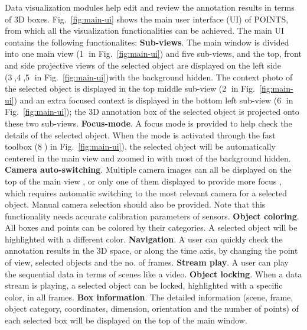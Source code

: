 \documentclass[letterpaper, 10 pt, conference]{ieeeconf}  %
\begin{document}
Data visualization modules help edit and review the annotation results in terms of 3D boxes. 
Fig.~\ref{fig:main-ui} shows the main user interface (UI) of POINTS, from which all the visualization functionalities can be achieved.
The main UI contains the following functionalites: 
\textbf{Sub-views}. The main window is divided into one main view (\textcircled{1} in Fig.~\ref{fig:main-ui}) and five sub-views,  and the top, front and side projective views of the selected object are displayed on the left side (\textcircled{3},\textcircled{4},\textcircled{5} in Fig.~\ref{fig:main-ui})with the background hidden. The context photo of the selected object is displayed in the top middle sub-view (\textcircled{2} in Fig.~\ref{fig:main-ui}) and an extra focused context is displayed in the bottom left sub-view (\textcircled{6} in Fig.~\ref{fig:main-ui}); the 3D annotation box of the selected object is projected onto these two sub-views.
\textbf{Focus-mode}. A focus mode is provided to help check the details of the selected object. When the mode is activated through the fast toolbox (\textcircled{8}) in Fig.~\ref{fig:main-ui}), the selected object will be automatically centered in the main view and zoomed in with most of the background hidden.
\textbf{Camera auto-switching}. Multiple camera images can all be displayed on the top of the main view \cite{Zimmer20193DBA}, or only one of them displayed to provide more focus \cite{scale,Wang2019LATTEAL,pointatme}, which requires automatic switching to the most relevant camera for a selected object. Manual camera selection should also be provided. Note that this functionality needs accurate calibration parameters of sensors.
\textbf{Object coloring}. All boxes and points can be colored by their categories. A selected object will be highlighted with a different color. 
\textbf{Navigation}. \label{sec:navigation} A user can quickly check the annotation results in the 3D space, or along the time axis, by changing the point of view, selected objects and the no. of frames.
\textbf{Stream play}. \label{sec:streamplay} A user can play the sequential data in terms of scenes like a video.
\textbf{Object locking}. When a data stream is playing, a selected object can be locked, highlighted with a specific color, in all frames.
\textbf{Box information}. The detailed information (scene, frame, object category, coordinates, dimension, orientation and the number of points) of each selected box will be displayed on the top of the main window.
\end{document}

